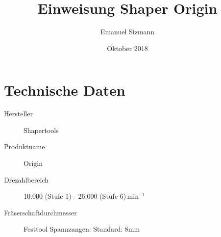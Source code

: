 \documentclass{\basedir/fablab-document}
\date{Oktober 2018}
\author{Emanuel Sizmann}
\title{Einweisung Shaper Origin}
\begin{document}
\dosecttoc
\faketableofcontents
{}




\section{Technische Daten}
\begin{description}
    \item[Hersteller] Shapertools
    \item[Produktname] Origin
    \item[Drezahlbereich] 10.000 (Stufe 1) - 26.000 (Stufe 6)$\,\mathrm{min}^{-1}$
    \item[Fräserschaftdurchmesser] Festtool Spannzangen: Standard: 8mm

\end{description}
\end{document}
